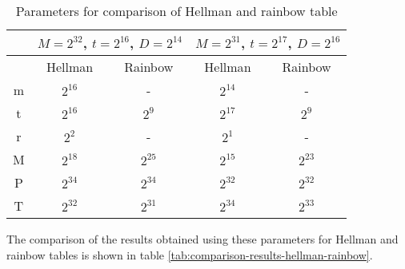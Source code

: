 \begin{table}[ht!]
\begin{center}
\begin{tabular}{|c|c c||c c|}
\hline
			& \multicolumn{2}{c||}{$M = 2^{32}$, $t = 2^{16}$, $D = 2^{14}$} 	& \multicolumn{2}{c|}{$M = 2^{31}$, $t = 2^{17}$, $D = 2^{16}$}	\\ \hline \hline
			&	Hellman				&	Rainbow					&	Hellman					& Rainbow				\\ \hline \hline
m			&	$2^{16}$			&		-							&	$2^{14}$				& 	-						\\ \hline 
t			&	$2^{16}$			&	$2^{9}$					&	$2^{17}$				& $2^{9}$				\\ \hline 
r			&	$2^{2}$				&		-							&	$2^{1}$					& 	-						\\ \hline 
M			&	$2^{18}$			&	$2^{25}$				&	$2^{15}$				& $2^{23}$			\\ \hline 
P			&	$2^{34}$			&	$2^{34}$				&	$2^{32}$				& $2^{32}$			\\ \hline 
T			&	$2^{32}$			&	$2^{31}$				&	$2^{34}$				& $2^{33}$			\\ \hline 
\end{tabular}
\end{center} 
\caption{Parameters for comparison of Hellman and rainbow table}
\label{tab:parameters-comparison}
\end{table}

The comparison of the results obtained using these parameters for Hellman and rainbow tables is shown in table \ref{tab:comparison-results-hellman-rainbow}.


